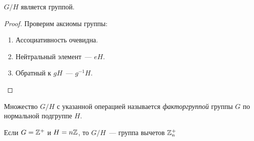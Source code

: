 	\newpage
	\begin{statement}
		$G/H$ является группой.
	\end{statement}
	\begin{proof}
		Проверим аксиомы группы:
		\begin{enumerate}
			\setlength\itemsep{0.1em}
			\item Ассоциативность очевидна.
			\item Нейтральный элемент~--- $eH.$
			\item Обратный к $gH$~--- $g^{-1}H.$ \qedhere 
		\end{enumerate}
	\end{proof}
	\begin{definition}
		Множество $G/H$ с указанной операцией называется \textit{факторгруппой} группы $G$ по нормальной подгруппе $H$.
	\end{definition}
	\begin{exmpl*}
		Если $G = \mathbb{Z} ^ + $ и $H = n\mathbb{Z}$, то $G/H$~--- группа вычетов $ \mathbb{Z}_n ^ +$
	\end{exmpl*}